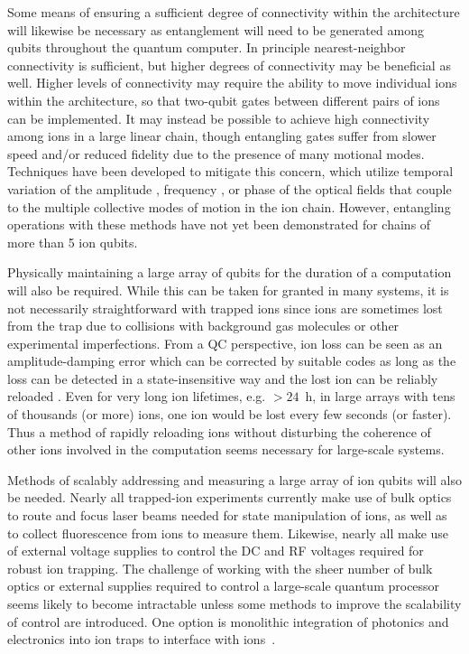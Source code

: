 \documentclass[%
reprint,
 amsmath,amssymb,
]{revtex4-1}
\begin{document}
Some means of ensuring a sufficient degree of connectivity within the architecture will likewise be necessary as entanglement will need to be generated among qubits throughout the quantum computer.  In principle nearest-neighbor connectivity is sufficient, but higher degrees of connectivity may be beneficial as well. Higher levels of connectivity may require the ability to move individual ions within the architecture, so that two-qubit gates between different pairs of ions can be implemented. It may instead be possible to achieve high connectivity among ions in a large linear chain, though entangling gates suffer from slower speed and/or reduced fidelity due to the presence of many motional modes.  Techniques have been developed to mitigate this concern, which utilize temporal variation of the amplitude \cite{ChoiMultimodeIonControl2014}, frequency \cite{LeungFreqMod2QGate2018}, or phase \cite{milne2018phase} of the optical fields that couple to the multiple collective modes of motion in the ion chain.  However, entangling operations with these methods have not yet been demonstrated for chains of more than 5 ion qubits.

Physically maintaining a large array of qubits for the duration of a computation will also be required.  While this can be taken for granted in many systems, it is not necessarily straightforward with trapped ions since ions are sometimes lost from the trap due to collisions with background gas molecules or other experimental imperfections. From a QC perspective, ion loss can be seen as an amplitude-damping error which can be corrected by suitable codes as long as the loss can be detected in a state-insensitive way and the lost ion can be reliably reloaded \cite{ValaAtomLossCorrection2005}. Even for very long ion lifetimes, e.g. $> 24$~h, in large arrays with tens of thousands (or more) ions, one ion would be lost every few seconds (or faster). Thus a method of rapidly reloading ions without disturbing the coherence of other ions involved in the computation \cite{Bruzewicz2016} seems necessary for large-scale systems.

Methods of scalably addressing and measuring a large array of ion qubits will also be needed. Nearly all trapped-ion experiments currently make use of bulk optics to route and focus laser beams needed for state manipulation of ions, as well as to collect fluorescence from ions to measure them.  Likewise, nearly all make use of external voltage supplies to control the DC and RF voltages required for robust ion trapping. The challenge of working with the sheer number of bulk optics or external supplies required to control a large-scale quantum processor seems likely to become intractable unless some methods to improve the scalability of control are introduced. One option is monolithic integration of photonics and electronics into ion traps to interface with ions~\cite{MehtaIntegrated2016, StuartDACTRap2018}.
\end{document}
